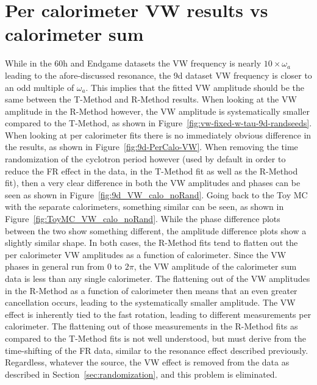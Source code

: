 \documentclass[12pt,letterpaper]{article}
\newcommand{\figref}[1]{Figure~\ref{#1}}
\def\wa{$\omega_{a}$\xspace}
\begin{document}
\clearpage


\section{Per calorimeter VW results vs calorimeter sum}


While in the 60h and Endgame datasets the VW frequency is nearly $10 \times \omega_{a}$ leading to the afore-discussed resonance, the 9d dataset VW frequency is closer to an odd multiple of \wa. This implies that the fitted VW amplitude should be the same between the T-Method and R-Method results. When looking at the VW amplitude in the R-Method however, the VW amplitude is systematically smaller compared to the T-Method, as shown in \figref{fig:vw-fixed-w-tau-9d-randseeds}. When looking at per calorimeter fits there is no immediately obvious difference in the results, as shown in \figref{fig:9d-PerCalo-VW}. When removing the time randomization of the cyclotron period however (used by default in order to reduce the FR effect in the data, in the T-Method fit as well as the R-Method fit), then a very clear difference in both the VW amplitudes and phases can be seen as shown in \figref{fig:9d_VW_calo_noRand}. Going back to the Toy MC with the separate calorimeters, something similar can be seen, as shown in \figref{fig:ToyMC_VW_calo_noRand}. While the phase difference plots between the two show something different, the amplitude difference plots show a slightly similar shape. In both cases, the R-Method fits tend to flatten out the per calorimeter VW amplitudes as a function of calorimeter. Since the VW phases in general run from 0 to $2\pi$, the VW amplitude of the calorimeter sum data is less than any single calorimeter. The flattening out of the VW amplitudes in the R-Method as a function of calorimeter then means that an even greater cancellation occurs, leading to the systematically smaller amplitude. The VW effect is inherently tied to the fast rotation, leading to different measurements per calorimeter. The flattening out of those measurements in the R-Method fits as compared to the T-Method fits is not well understood, but must derive from the time-shifting of the FR data, similar to the resonance effect described previously. Regardless, whatever the source, the VW effect is removed from the data as described in Section~\ref{sec:randomization}, and this problem is eliminated.
\end{document}
